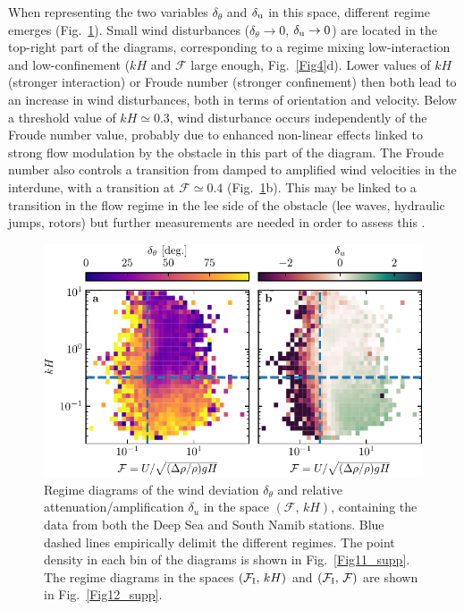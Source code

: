   When representing the two variables $\delta_{\theta}$ and $\delta_{\textup{u}}$ in this space, different regime emerges (Fig.~\ref{Fig5}). Small wind disturbances ($\delta_{\theta} \to 0$, $\delta_{\textup{u}} \to 0$) are located in the top-right part of the diagrams, corresponding to a regime mixing low-interaction and low-confinement ($k H$ and $\mathcal{F}$ large enough, Fig.~\ref{Fig4}d).
  Lower values of $k H$ (stronger interaction) or Froude number (stronger confinement) then both lead to an increase in wind disturbances, both in terms of orientation and velocity. Below a threshold value of $k H \simeq 0.3$, wind disturbance occurs independently of the Froude number value, probably due to enhanced non-linear effects linked to strong flow modulation by the obstacle in this part of the diagram. The Froude number also controls a transition from damped to amplified wind velocities in the interdune, with a transition at $\mathcal{F} \simeq 0.4$ (Fig.~\ref{Fig5}b). This may be linked to a transition in the flow regime in the lee side of the obstacle (lee waves, hydraulic jumps, rotors) but further measurements are needed in order to assess this \citep{baines1995, Vosper2004}.


  \begin{figure}
    \centering
    \includegraphics[scale=1]{Figures/Figure5.pdf}
    \caption{Regime diagrams of the wind deviation $\delta_{\theta}$ and relative attenuation/amplification $\delta_{u}$ in the space $(\mathcal{F}, \, kH)$, containing the data from both the Deep Sea and South Namib stations. Blue dashed lines empirically delimit the different regimes. The point density in each bin of the diagrams is shown in Fig.~\ref{Fig11_supp}. The regime diagrams in the spaces $(\mathcal{F}_{\textup{I}}, \, kH)$ and $(\mathcal{F}_{\textup{I}}, \, \mathcal{F})$ are shown in Fig.~\ref{Fig12_supp}.}
    \label{Fig5}
  \end{figure}

